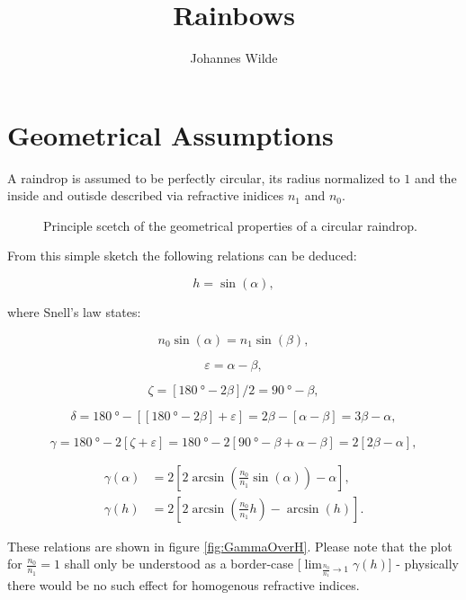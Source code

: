 \documentclass[pagesize=pdftex,paper=a4,fontsize=12pt]{scrartcl}
\title{Rainbows}
\author{Johannes Wilde}
\begin{document}
\maketitle

\section{Geometrical Assumptions}

A raindrop is assumed to be perfectly circular, its radius normalized to $1$ and the inside and outisde described via refractive inidices $n_1$ and $n_0$.

\begin{figure}[H]
	\centering
	
	\caption{Principle scetch of the geometrical properties of a circular raindrop.}
	\label{fig:PrincipleScetch}
\end{figure}

From this simple sketch the following relations can be deduced:

\[ h = \sin(\alpha), \]

where Snell's law states:

\[ n_0 \sin(\alpha) = n_1 \sin(\beta), \]

\[ \varepsilon = \alpha - \beta, \]

\[ \zeta = [\SI{180}{\degree} - 2 \beta] / 2 = \SI{90}{\degree} - \beta, \]

\[ \delta = \SI{180}{\degree} - [[\SI{180}{\degree} - 2 \beta] + \varepsilon] = 2 \beta - [\alpha - \beta] = 3 \beta - \alpha, \]

\[ \gamma = \SI{180}{\degree} - 2 [\zeta + \varepsilon] = \SI{180}{\degree} - 2 [\SI{90}{\degree} - \beta + \alpha - \beta] = 2 [2 \beta - \alpha], \]

\begin{align}
	\gamma (\alpha) & = 2 \left[2 \arcsin\left(\frac{n_0}{n_1} \sin(\alpha)\right) - \alpha\right], \nonumber \\[.5em]
	\gamma (h) & = 2 \left[2 \arcsin\left(\frac{n_0}{n_1} h\right) - \arcsin(h)\right].
\end{align}

These relations are shown in figure \ref{fig:GammaOverH}. Please note that the plot for $\frac{n_0}{n_1} = 1$ shall only be understood as a border-case [$\lim_{\frac{n_0}{n_1} \to 1} \gamma (h)$] - physically there would be no such effect for homogenous refractive indices.
\end{document}
